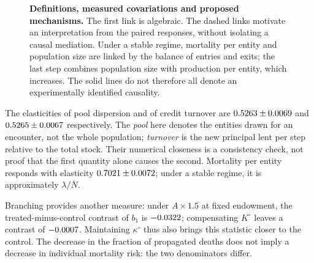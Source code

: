\begin{figure}[htbp]\centering
{}
\caption{\textbf{Definitions, measured covariations and proposed
mechanisms.} The first link is algebraic. The dashed links motivate an
interpretation from the paired responses, without isolating a causal
mediation. Under a stable regime, mortality per entity and population
size are linked by the balance of entries and exits; the last step
combines population size with production per entity, which increases.
The solid lines do not therefore all denote an experimentally
identified causality.}
\label{fig:chaine}
\end{figure}

The elasticities of pool dispersion and of credit turnover are
$0.5263\pm0.0069$ and
$0.5265\pm0.0067$ respectively. The
\emph{pool} here denotes the entities drawn for an encounter, not the
whole population; \emph{turnover} is the new principal lent per step
relative to the total stock. Their numerical closeness is a consistency
check, not proof that the first quantity alone causes the second.
Mortality per entity responds with elasticity
$0.7021\pm0.0072$; under a stable regime,
it is approximately $\lambda/\overline N$.

Branching provides another measure: under $A\times1.5$ at fixed
endowment, the treated-minus-control contrast of $b_1$ is
$-0.0322$; compensating $K^\circ$ leaves a contrast of
$-0.0007$. Maintaining $\kappa^\circ$ thus also
brings this statistic closer to the control. The decrease in the
fraction of propagated deaths does not imply a decrease in individual
mortality risk: the two denominators differ.

